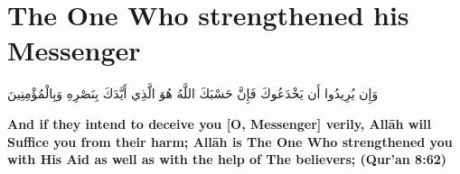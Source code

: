\chapter{The One Who strengthened his Messenger}
\begin{center}
    {\Huge    
        \begin{Arabic}
            وَإِن يُرِيدُوا أَن يَخْدَعُوكَ فَإِنَّ حَسْبَكَ اللَّهُ هُوَ الَّذِي أَيَّدَكَ بِنَصْرِهِ وَبِالْمُؤْمِنِينَ
        \end{Arabic}
    }    
\end{center}
\vspace*{\fill}
\vspace{3cm}
\begin{center}
    \large \textbf{And if they intend to deceive you [O, Messenger] verily, Allāh will Suffice you from their harm; Allāh is The One Who strengthened you with His Aid as well as with the help of The believers; (Qur'an 8:62)}
\end{center}
